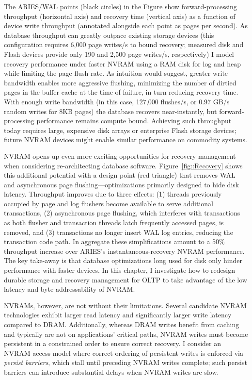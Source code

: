 

The ARIES/WAL points (black circles) in the Figure show forward-processing throughput (horizontal axis) and recovery time (vertical axis) as a function of device write throughput (annotated alongside each point as pages per second).
As database throughput can greatly outpace existing storage devices (this configuration requires 6,000 page writes/s to bound recovery; measured disk and Flash devices provide only 190 and 2,500 page writes/s, respectively) I model recovery performance under faster NVRAM using a RAM disk for log and heap while limiting the page flush rate.
As intuition would suggest, greater write bandwidth enables more aggressive flushing, minimizing the number of dirtied pages in the buffer cache at the time of failure, in turn reducing recovery time.
With enough write bandwidth (in this case, 127,000 flushes/s, or 0.97 GB/s random writes for 8KB pages) the database recovers near-instantly, but forward-processing performance remains compute bound.
Achieving such throughput today requires large, expensive disk arrays or enterprise Flash storage devices; future NVRAM devices might enable similar performance on commodity systems.

NVRAM opens up even more exciting opportunities for recovery management when considering re-architecting database software.
Figure~\ref{fig::Recovery} shows this additional potential with a design point (red triangle) that removes WAL and asynchronous page flushing---optimizations primarily designed to hide disk latency.
Throughput improves due to three effects: (1) threads previously occupied by page and log flushers become available to serve additional transactions, (2) asynchronous page flushing, which interferes with transactions as both flusher and transaction threads latch frequently accessed pages, is removed, and (3) transactions no longer insert WAL log entries, reducing the transaction code path.
In aggregate these simplifications amount to a 50\% throughput increase over ARIES's instantaneous-recovery NVRAM performance.
The key take-away is that database optimizations long used for disk only hinder performance with faster devices.
In this chapter, I investigate how to redesign durable storage and recovery management for OLTP to take advantage of the low latency and byte-addressability of NVRAM.

NVRAMs, however, are not without their limitations.
Se\-veral candidate NVRAM technologies exhibit larger read latency and significantly larger write latency compared to DRAM.
Additionally, whereas DRAM writes benefit from caching and typically are not on applications' critical paths, NVRAM writes must become persistent in a constrained order to ensure correct recovery.
I consider an NVRAM access model where correct ordering of persistent writes is enforced via \emph{persist barriers}, which stall until preceding NVRAM writes complete; such persist barriers can introduce substantial delays when NVRAM writes are slow.

